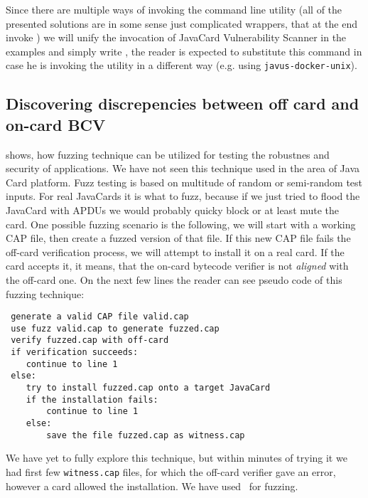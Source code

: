         Since there are multiple ways of invoking the command line utility \javus (all of the presented solutions are in some sense just complicated wrappers, that at the end invoke \javus) we will unify the invocation of JavaCard Vulnerability Scanner in the examples and simply write \javus, the reader is expected to substitute this command in case he is invoking the utility in a different way (e.g. using \texttt{javus-docker-unix}).




\subsection{Discovering discrepencies between off card and on-card BCV}\label{subsec:onofffuzzing}

    \cite{ossfuzz} shows, how fuzzing technique can be utilized for testing the robustnes and security of applications. We have not seen this technique used in the area of Java Card platform. Fuzz testing is based on multitude of random or semi-random test inputs. For real JavaCards it is what to fuzz, because if we just tried to flood the JavaCard with APDUs we would probably quicky block or at least mute the card.
        One possible fuzzing scenario is the following, we will start with a working CAP file, then create a fuzzed version of that file. If this new CAP file fails the off-card verification process, we will attempt to install it on a real card. If the card accepts it, it means, that the on-card bytecode verifier is not \textit{aligned} with the off-card one. On the next few lines the reader can see pseudo code of this fuzzing technique:

\begin{verbatim}
 generate a valid CAP file valid.cap
 use fuzz valid.cap to generate fuzzed.cap
 verify fuzzed.cap with off-card
 if verification succeeds:
    continue to line 1
 else:
    try to install fuzzed.cap onto a target JavaCard
    if the installation fails:
        continue to line 1
    else: 
        save the file fuzzed.cap as witness.cap
\end{verbatim}
We have yet to fully explore this technique, but within minutes of trying it we had first few \texttt{witness.cap} files, for which the off-card verifier gave an error, however a card allowed the installation. We have used~\cite{radamsa} for fuzzing.



